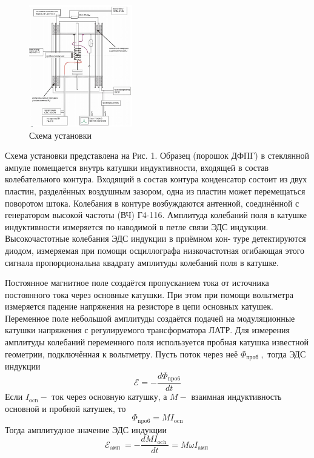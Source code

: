 \documentclass[a4paper, 12pt]{article}%
\begin{document}
\begin{figure}
  \begin{center}
    \includegraphics[width = 0.4\textwidth]{3.jpg}
  \end{center}
  \caption{Схема установки}
\end{figure}

Схема установки представлена на Рис. 1. Образец (порошок ДФПГ) в стеклянной ампуле помещается внутрь катушки индуктивности, входящей в состав колебательного контура. Входящий в состав контура конденсатор состоит из двух пластин, разделённых воздушным зазором, одна из пластин может перемещаться поворотом штока. Колебания в контуре возбуждаются антенной, соединённой с генератором высокой частоты (ВЧ) Г4-116. Амплитуда колебаний поля в катушке индуктивности измеряется по наводимой в петле связи ЭДС индукции. Высокочастотные колебания ЭДС индукции в приёмном кон-
туре детектируются диодом, измеряемая при помощи осциллографа низкочастотная огибающая этого сигнала пропорциональна квадрату амплитуды колебаний поля в катушке.

Постоянное магнитное поле создаётся пропусканием тока от источника постоянного тока через основные катушки. При этом при помощи вольтметра измеряется падение напряжения на резисторе в цепи основных катушек. Переменное поле небольшой амплитуды создаётся подачей на модуляционные катушки напряжения с регулируемого трансформатора ЛАТР. Для измерения амплитуды колебаний переменного поля используется пробная катушка известной геометрии, подключённая к вольтметру. Пусть поток через неё $\Phi_{\text {проб }},$ тогда ЭДС индукции
$$
\mathcal{E}=-\frac{d \Phi_{\mathrm{npo} 6}}{d t}
$$
Если $I_{\mathrm{ocn}}-$ ток через основную катушку, а $M-$ взаимная индуктивность основной и пробной катушек, то
$$
\Phi_{\mathrm{npo} 6}=M I_{\mathrm{ocn}}
$$
Тогда амплитудное значение ЭДС индукции
$$
\mathcal{E}_{\text {aмп }}=-\frac{d M I_{\text {och }}}{d t}=M \omega I_{\text {aмп }}
$$
\end{document}
